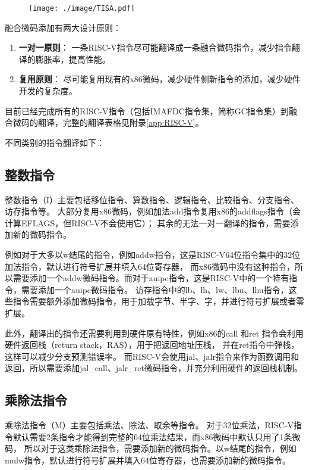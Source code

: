 \begin{figure}[!htbp]
  \centering
  \texttt{[image: ./image/TISA.pdf]}
  \label{img:TISA}
\end{figure}

融合微码添加有两大设计原则：
\begin{enumerate}
  \item \textbf{一对一原则}： 一条RISC-V指令尽可能翻译成一条融合微码指令，减少指令翻译的膨胀率，提高性能。
  \item \textbf{复用原则}： 尽可能复用现有的x86微码，减少硬件侧新指令的添加，减少硬件开发的复杂度。
\end{enumerate}

目前已经完成所有的RISC-V指令（包括IMAFDC指令集，简称GC指令集）到融合微码的翻译，完整的翻译表格见附录\ref{app:RISC-V}。

不同类别的指令翻译如下：

\subsection{整数指令}
整数指令（I）主要包括移位指令、算数指令、逻辑指令、比较指令、分支指令、访存指令等。
大部分复用x86微码，例如加法add指令复用x86的addflags指令（会计算EFLAGS，但RISC-V不会使用它）；
其余的无法一对一翻译的指令，需要添加新的微码指令。

例如对于大多以w结尾的指令，例如addw指令，这是RISC-V64位指令集中的32位加法指令，默认进行符号扩展并填入64位寄存器，
而x86微码中没有这种指令，所以需要添加一个addw微码指令。而对于auipc指令，这是RISC-V中的一个特有指令，需要添加一个auipc微码指令。
访存指令中的lb、lh、lw、lbu、lhu指令，这些指令需要额外添加微码指令，用于加载字节、半字、字，并进行符号扩展或者零扩展。

此外，翻译出的指令还需要利用到硬件原有特性，例如x86的call 和ret 指令会利用硬件返回栈（return stack，RAS），用于把返回地址压栈，
并在ret指令中弹栈，这样可以减少分支预测错误率。
而RISC-V会使用jal、jalr指令来作为函数调用和返回，所以需要添加jal\_call、jalr\_ret微码指令，并充分利用硬件的返回栈机制。


\subsection{乘除法指令}
乘除法指令（M）主要包括乘法、除法、取余等指令。
对于32位乘法，RISC-V指令默认需要2条指令才能得到完整的64位乘法结果，而x86微码中默认只用了1条微码，
所以对于这类乘除法指令，需要添加新的微码指令。以w结尾的指令，例如mulw指令，默认进行符号扩展并填入64位寄存器，也需要添加新的微码指令。

